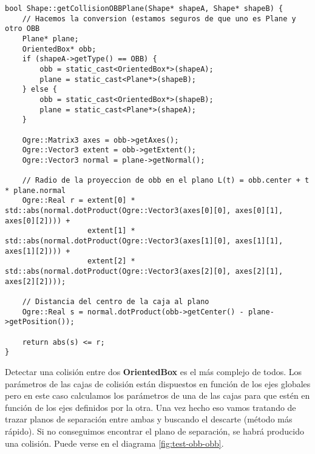 \begin{lstlisting}[style=C++]
bool Shape::getCollisionOBBPlane(Shape* shapeA, Shape* shapeB) {
    // Hacemos la conversion (estamos seguros de que uno es Plane y otro OBB
    Plane* plane;
    OrientedBox* obb;
    if (shapeA->getType() == OBB) {
        obb = static_cast<OrientedBox*>(shapeA);
        plane = static_cast<Plane*>(shapeB);
    } else {
        obb = static_cast<OrientedBox*>(shapeB);
        plane = static_cast<Plane*>(shapeA);
    }

    Ogre::Matrix3 axes = obb->getAxes();
    Ogre::Vector3 extent = obb->getExtent();
    Ogre::Vector3 normal = plane->getNormal();

    // Radio de la proyeccion de obb en el plano L(t) = obb.center + t * plane.normal
    Ogre::Real r = extent[0] * std::abs(normal.dotProduct(Ogre::Vector3(axes[0][0], axes[0][1], axes[0][2]))) +
                   extent[1] * std::abs(normal.dotProduct(Ogre::Vector3(axes[1][0], axes[1][1], axes[1][2]))) +
                   extent[2] * std::abs(normal.dotProduct(Ogre::Vector3(axes[2][0], axes[2][1], axes[2][2])));

    // Distancia del centro de la caja al plano
    Ogre::Real s = normal.dotProduct(obb->getCenter() - plane->getPosition());
    
    return abs(s) <= r;
}
\end{lstlisting}

Detectar una colisión entre dos \textbf{OrientedBox} es el más complejo de
todos. Los parámetros de las cajas de colisión están dispuestos en función
de los ejes globales pero en este caso calculamos los parámetros de una
de las cajas para que estén en función de los ejes definidos por la otra.
Una vez hecho eso vamos tratando de trazar planos de separación entre ambas
y buscando el descarte (método más rápido). Si no conseguimos encontrar el plano
de separación, se habrá producido una colisión. Puede verse en el diagrama
\ref{fig:test-obb-obb}.\\


